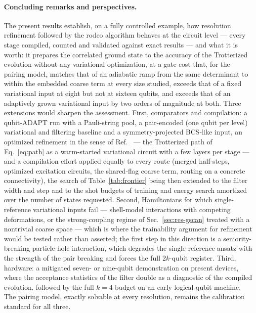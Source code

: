 \documentclass[
  aps,            %
  prc,            %
  reprint,        %
  superscriptaddress,
  floatfix,
  nofootinbib
]{revtex4-2}
\begin{document}
\paragraph{Concluding remarks and perspectives.}
The present results establish, on a fully controlled example, how resolution
refinement followed by the rodeo algorithm behaves at the circuit level ---
every stage compiled, counted and validated against exact results --- and
what it is worth: it prepares the correlated ground state to the accuracy of
the Trotterized evolution without any variational optimization, at a gate
cost that, for the pairing model, matches that of an adiabatic ramp from
the same determinant to within the embedded coarse term at every size
studied, exceeds that of a fixed variational input at eight but not at
sixteen qubits, and exceeds that of an adaptively grown variational input
by two orders of magnitude at both.  Three extensions would sharpen the assessment.
First, comparators and compilation: a qubit-ADAPT run with a Pauli-string
pool, a pair-encoded (one qubit per level) variational and filtering
baseline and a symmetry-projected BCS-like input, an optimized refinement in the sense of
Ref.~\cite{Sadia2026} --- the Trotterized path of Eq.~\eqref{eq:path} as a
warm-started variational circuit with a few layers per stage --- and a
compilation effort applied equally to every route (merged half-steps,
optimized excitation circuits, the shared-flag coarse term, routing on a
concrete connectivity), the search of Table~\ref{tab:frontier} being then
extended to the filter width and step and to the shot budgets of training
and energy search amortized over the number of states requested.  Second, Hamiltonians for which single-reference
variational inputs fail --- shell-model interactions with competing
deformations, or the strong-coupling regime of Sec.~\ref{sec:res-gscan}
treated with a nontrivial coarse space --- which is where the trainability
argument for refinement would be tested rather than asserted; the first
step in this direction is a seniority-breaking particle-hole interaction,
which degrades the single-reference ansatz with the strength of the pair
breaking and forces the full $2k$-qubit register.  Third,
hardware: a mitigated seven- or nine-qubit demonstration on present devices,
where the acceptance statistics of the filter double as a diagnostic of the
compiled evolution, followed by the full $k=4$ budget on an early
logical-qubit machine.  The pairing model, exactly solvable at every
resolution, remains the calibration standard for all three.
\end{document}
